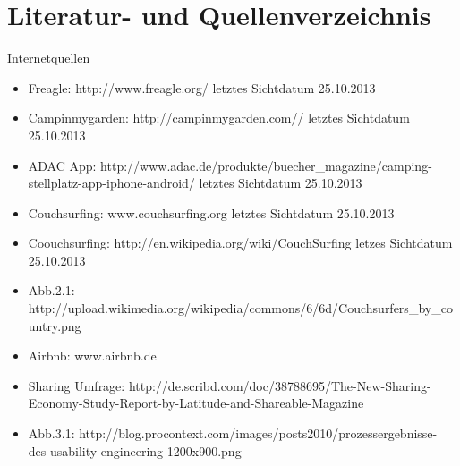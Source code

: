 

\chapter{Literatur- und Quellenverzeichnis}

Internetquellen 
\begin{itemize}
\item
Freagle: http://www.freagle.org/ letztes Sichtdatum 25.10.2013
\item
Campinmygarden: http://campinmygarden.com// letztes Sichtdatum 25.10.2013
\item
ADAC App: http://www.adac.de/produkte/buecher\_magazine/camping-stellplatz-app-iphone-android/ letztes Sichtdatum 25.10.2013
\item
Couchsurfing: www.couchsurfing.org letztes Sichtdatum 25.10.2013
\item
Coouchsurfing: http://en.wikipedia.org/wiki/CouchSurfing letzes Sichtdatum 25.10.2013
\item
Abb.2.1: http://upload.wikimedia.org/wikipedia/commons/6/6d/Couchsurfers\_by\_country.png
\item
Airbnb: www.airbnb.de
\item
Sharing Umfrage: http://de.scribd.com/doc/38788695/The-New-Sharing-Economy-Study-Report-by-Latitude-and-Shareable-Magazine 
\item
Abb.3.1: http://blog.procontext.com/images/posts2010/prozessergebnisse-des-usability-engineering-1200x900.png


\end{itemize}

\newpage
